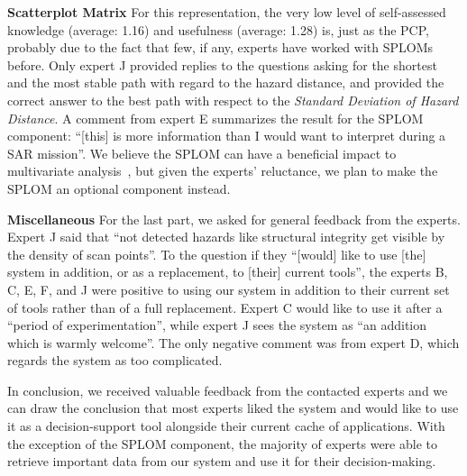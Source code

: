 \documentclass{egpubl}
\begin{document}
\noindent \textbf{Scatterplot Matrix} For this representation, the very low level of self-assessed knowledge (average: 1.16) and usefulness (average: 1.28) is, just as the PCP, probably due to the fact that few, if any, experts have worked with SPLOMs before. Only expert J provided replies to the questions asking for the shortest and the most stable path with regard to the hazard distance, and provided the correct answer to the best path with respect to the \emph{Standard Deviation of Hazard Distance}. A comment from expert E summarizes the result for the SPLOM component: ``[this] is more information than I would want to interpret during a SAR mission''. We believe the SPLOM can have a beneficial impact to multivariate analysis~\cite{6064985}, but given the experts' reluctance, we plan to make the SPLOM an optional component instead.

\noindent \textbf{Miscellaneous} For the last part, we asked for general feedback from the experts. Expert J said that ``not detected hazards like structural integrity get visible by the density of scan points''. To the question if they ``[would] like to use [the] system in addition, or as a replacement, to [their] current tools'', the experts B, C, E, F, and J were positive to using our system in addition to their current set of tools rather than of a full replacement. Expert C would like to use it after a ``period of experimentation'', while expert J sees the system as ``an addition which is warmly welcome''. The only negative comment was from expert D, which regards the system as too complicated. 

In conclusion, we received valuable feedback from the contacted experts and we can draw the conclusion that most experts liked the system and would like to use it as a decision-support tool alongside their current cache of applications. With the exception of the SPLOM component, the majority of experts were able to retrieve important data from our system and use it for their decision-making.

\end{document}
